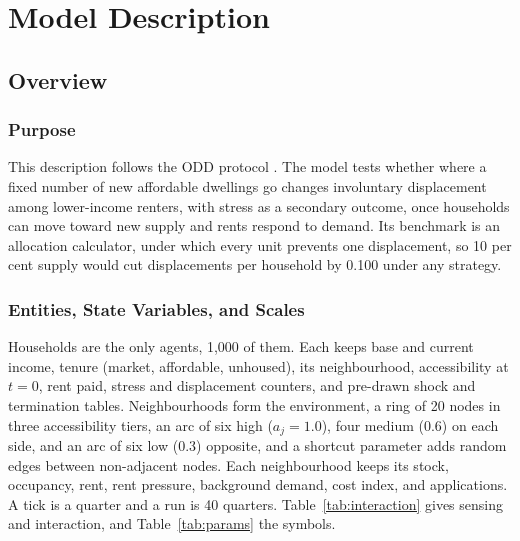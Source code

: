 \documentclass[10pt,a4paper]{article}
\begin{document}
\section*{Model Description}

\subsection*{Overview}

\subsubsection*{Purpose}

This description follows the ODD protocol \citep{24}. The model tests whether where a fixed number of new affordable dwellings go changes involuntary displacement among lower-income renters, with stress as a secondary outcome, once households can move toward new supply and rents respond to demand. Its benchmark is an allocation calculator, under which every unit prevents one displacement, so 10 per cent supply would cut displacements per household by 0.100 under any strategy.

\subsubsection*{Entities, State Variables, and Scales}

Households are the only agents, 1,000 of them. Each keeps base and current income, tenure (market, affordable, unhoused), its neighbourhood, accessibility at $t=0$, rent paid, stress and displacement counters, and pre-drawn shock and termination tables. Neighbourhoods form the environment, a ring of 20 nodes in three accessibility tiers, an arc of six high ($a_j=1.0$), four medium (0.6) on each side, and an arc of six low (0.3) opposite, and a shortcut parameter adds random edges between non-adjacent nodes. Each neighbourhood keeps its stock, occupancy, rent, rent pressure, background demand, cost index, and applications. A tick is a quarter and a run is 40 quarters. Table~\ref{tab:interaction} gives sensing and interaction, and Table~\ref{tab:params} the symbols.
\end{document}

